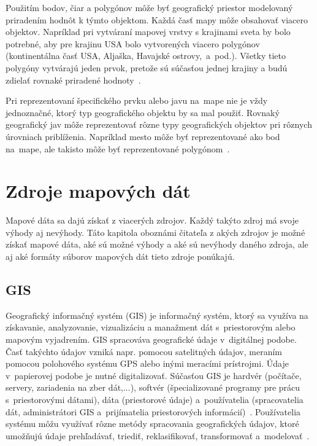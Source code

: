 Použitím bodov, čiar a polygónov môže byť geografický priestor modelovaný priradením hodnôt k týmto objektom. Každá časť mapy môže obsahovať viacero objektov. Napríklad pri vytváraní mapovej vrstvy s krajinami sveta by bolo potrebné, aby pre krajinu USA bolo vytvorených viacero polygónov (kontinentálna časť USA, Aljaška, Havajské ostrovy,~a~pod.). Všetky tieto polygóny vytvárajú jeden prvok, pretože sú súčasťou jednej krajiny a budú zdielať rovnaké priradené hodnoty~\cite{introductiontogis}.

Pri reprezentovaní špecifického prvku alebo javu na~mape nie je vždy jednoznačné, ktorý typ geografického objektu by sa mal použiť. Rovnaký geografický jav môže reprezentovať rôzne typy geografických objektov pri rôznych úrovniach priblíženia. Napríklad mesto môže byť reprezentované ako bod na~mape, ale takisto môže byť reprezentované polygónom~\cite{geographicobjects}.



\chapter{Zdroje mapových dát}
\label{source-map-data}
Mapové dáta sa dajú získať z viacerých zdrojov. Každý takýto zdroj má svoje výhody aj nevýhody. Táto kapitola oboznámi čitateľa z akých zdrojov je možné získať mapové dáta, aké sú možné výhody a aké sú nevýhody daného zdroja, ale aj aké formáty súborov mapových dát tieto zdroje ponúkajú. 


\section{GIS}
Geografický informačný systém (GIS) je informačný systém, ktorý sa využíva na získavanie, analyzovanie, vizualizáciu a manažment dát s~priestorovým alebo mapovým vyjadrením. GIS spracováva geografické údaje v~digitálnej podobe. Časť takýchto údajov vzniká napr. pomocou satelitných údajov, meraním pomocou polohového systému GPS alebo inými meracími prístrojmi. Údaje v~papierovej podobe je nutné digitalizovať. Súčasťou GIS je hardvér (počítače, servery, zariadenia na zber dát,...), softvér (špecializované programy pre prácu s~priestorovými dátami), dáta (priestorové údaje) a~používatelia (spracovatelia dát, administrátori GIS a~prijímatelia priestorových informácií)~\cite{introductiontogis}. Používatelia systému môžu využívať rôzne metódy spracovania geografických údajov, ktoré umožňujú údaje prehľadávať, triediť, reklasifikovať, transformovať a~modelovať~\cite{hofierka2003gis}.

